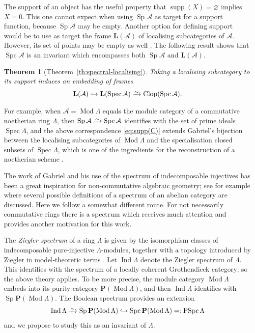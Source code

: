 \documentclass[a4paper]{amsart}
\theoremstyle{plain}
\newtheorem*{Thm}{Theorem}
\theoremstyle{definition}
\theoremstyle{remark}
\numberwithin{equation}{section}
\newcommand{\Clop}{\operatorname{Clop}}
\newcommand{\Ind}{\operatorname{Ind}}
\newcommand{\Mod}{\operatorname{Mod}}
\newcommand{\PSpc}{\operatorname{PSpc}}
\newcommand{\Sp}{\operatorname{Sp}}
\newcommand{\Spc}{\operatorname{Spc}}
\newcommand{\Spec}{\operatorname{Spec}}
\newcommand{\supp}{\operatorname{supp}}
\newcommand{\iso}{\xrightarrow{\raisebox{-.4ex}[0ex][0ex]{$\scriptstyle{\sim}$}}}
\def\A{\mathcal A}
\def\bfL{\mathbf L}
\def\bfP{\mathbf P}
\def\La{\Lambda}
\begin{document}
The support of an object has the useful property that $\supp(X)=\varnothing$ implies
$X=0$. This  one cannot expect when using $\Sp\A$ as target for
a support function, because $\Sp\A$ may be empty. Another option for
defining support would be to use as target the frame $\bfL(\A)$ of
localising subcategories of $\A$. However, its set of points may be
empty as well \cite{St2024}. The following result shows that $\Spc\A$
is an invariant which encompasses both $\Sp\A$ and $\bfL(\A)$.

\begin{Thm}[Theorem~\ref{th:spectral-localising}]
  Taking a localising subcategory to its support induces an embedding
  of frames
\[\bfL(\A)\hookrightarrow\bfL(\Spec\A)\iso\Clop(\Spc\A).\]
\end{Thm}

For example, when $\A=\Mod\La$ equals the module category of a commutative
noetherian ring $\La$, then $\Sp\A\iso\Spc\A$ identifies with the set
of prime ideals $\Spec\La$, and the above correspondence
\eqref{eq:supp(C)} extends Gabriel's bijection between the localising
subcategories of $\Mod\La$ and the specialisation closed subsets of
$\Spec\La$, which is one of the ingredients for the reconstruction of a
noetherian scheme \cite{Ga1962}.

The work of Gabriel and his use of the spectrum of indecomposable
injectives has been a great inspiration for non-commutative algebraic
geometry; see for example \cite{Br2018,Ka2015,Ro1995} where several possible
definitions of a spectrum of an abelian category are discussed. Here
we follow a somewhat different route. For not necessarily commutative
rings there is a spectrum which receives much attention and provides
another motivation for this work.

The \emph{Ziegler spectrum} of a ring $\La$ is given by the
isomorphism classes of indecomposable pure-injective $\La$-modules,
together with a topology introduced by Ziegler in model-theoretic
terms \cite{Zi1984}. Let $\Ind\La$  denote the Ziegler spectrum
of $\La$. This identifies with the spectrum of a locally coherent
Grothendieck category; so the above theory applies. To be more
precise, the module category $\Mod\La$ embeds into its purity category
$\bfP(\Mod\La)$, and then $\Ind\La$ identifies with
$\Sp\bfP(\Mod\La)$. The Boolean spectrum provides an extension
\begin{equation}\label{eq:Ind-PSpc}
  \Ind\La\iso\Sp\bfP(\Mod\La)\hookrightarrow\Spc\bfP(\Mod\La)=:
  \PSpc\La
\end{equation}
and we propose to study this as an invariant of $\La$.
\end{document}
